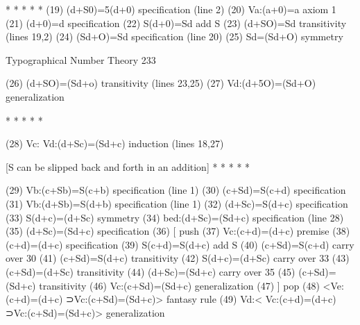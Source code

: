                                     *   *   *   *   *
(19) (d+S0)=5(d+0)                                        specification (line 2)
(20) Va:(a+0)=a                                           axiom 1
(21) (d+0)=d                                              specification
(22) S(d+0)=Sd                                            add S
(23) (d+SO)=Sd                                            transitivity (lines 19,2)
(24) (Sd+O)=Sd                                            specification (line 20)
(25) Sd=(Sd+O)                                            symmetry




Typographical Number Theory                                                           233

(26) (d+SO)=(Sd+o)                                       transitivity (lines 23,25)
(27) Vd:(d+5O)=(Sd+O)                                    generalization

                                 *   *   *   *   *

(28) Vc: Vd:(d+Sc)=(Sd+c)                                induction (lines 18,27)

                  [S can be slipped back and forth in an addition]
                                  * * * * *

(29) Vb:(c+Sb)=S(c+b)                                    specification (line 1)
(30) (c+Sd)=S(c+d)                                       specification
(31) Vb:(d+Sb)=S(d+b)                                    specification (line 1)
(32) (d+Sc)=S(d+c)                                       specification
(33) S(d+c)=(d+Sc)                                       symmetry
(34) bed:(d+Sc)=(Sd+c)                                   specification (line 28)
(35) (d+Sc)=(Sd+c)                                       specification
(36) [                                                   push
(37) Vc:(c+d)=(d+c)                                      premise
(38) (c+d)=(d+c)                                         specification
(39) S(c+d)=S(d+c)                                       add S
(40) (c+Sd)=S(c+d)                                       carry over 30
(41) (c+Sd)=S(d+c)                                       transitivity
(42) S(d+c)=(d+Sc)                                       carry over 33
(43) (c+Sd)=(d+Sc)                                       transitivity
(44) (d+Sc)=(Sd+c)                                       carry over 35
(45) (c+Sd)=(Sd+c)                                       transitivity
(46) Vc:(c+Sd)=(Sd+c)                                    generalization
(47) ]                                                   pop
(48) <Ve:(c+d)=(d+c) ⊃Vc:(c+Sd)=(Sd+c)>                  fantasy rule
(49) Vd:< Vc:(c+d)=(d+c) ⊃Vc:(c+Sd)=(Sd+c)>              generalization

